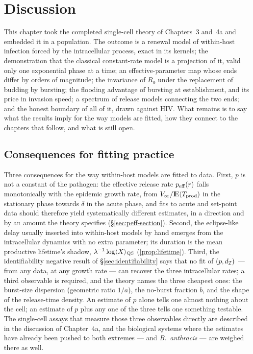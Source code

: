 
\section{Discussion}
\label{sec:discussion}

This chapter took the completed single-cell theory of Chapters~3 and~4a and
embedded it in a population. The outcome is a renewal model of within-host
infection forced by the intracellular process, exact in its kernels; the
demonstration that the classical constant-rate model is a projection of it,
valid only one exponential phase at a time; an effective-parameter map whose
ends differ by orders of magnitude; the invariance of $R_0$ under the
replacement of budding by bursting; the flooding advantage of bursting at
establishment, and its price in invasion speed; a spectrum of release models
connecting the two ends; and the honest boundary of all of it, drawn against
HIV. What remains is to say what the results imply for the way models are
fitted, how they connect to the chapters that follow, and what is still
open.

\subsection{Consequences for fitting practice}
\label{sec:discussion-fitting}

Three consequences for the way within-host models are fitted to data.
First, $p$ is not a constant of the pathogen: the effective release rate
$p_{\rm eff}(r)$ falls monotonically with the epidemic growth rate, from
$V_\infty/{\rm I}\!{\rm E}(T_{\rm prod})$ in the stationary phase towards $\delta$ in
the acute phase, and fits to acute and set-point data should therefore
yield systematically different estimates, in a direction and by an amount
the theory specifies (\S\ref{sec:peff-section}). Second, the eclipse-like
delay usually inserted into within-host models by hand emerges from the
intracellular dynamics with no extra parameter; its duration is the mean
productive lifetime's shadow, $\lambda^{-1}\log\langle X\rangle_{\rm QS}$
(\eqref{prop:lifetime}). Third, the identifiability negative result of
\S\ref{sec:identifiability} says that no fit of $(p,d_{\mathcal{I}})$ --- from
any data, at any growth rate --- can recover the three intracellular rates;
a third observable is required, and the theory names the three cheapest
ones: the burst-size dispersion (geometric ratio $1/a$), the no-burst
fraction $b$, and the shape of the release-time density. An estimate of $p$
alone tells one almost nothing about the cell; an estimate of $p$ plus any
one of the three tells one something testable. The single-cell assays that
measure those three observables directly are described in the discussion of
Chapter~4a, and the biological systems where the estimates have already
been pushed to both extremes --- \ft{} and \textit{B.~anthracis} --- are
weighed there as well.

